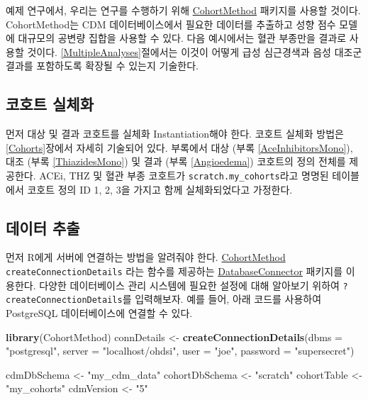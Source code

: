 \documentclass[10.5pt]{book}
\newenvironment{Shaded}{\begin{snugshade}}{\end{snugshade}}
\newcommand{\KeywordTok}[1]{\textcolor[rgb]{0.13,0.29,0.53}{\textbf{#1}}}
\newcommand{\DataTypeTok}[1]{\textcolor[rgb]{0.13,0.29,0.53}{#1}}
\newcommand{\StringTok}[1]{\textcolor[rgb]{0.31,0.60,0.02}{#1}}
\newcommand{\NormalTok}[1]{#1}
\theoremstyle{definition}
\theoremstyle{definition}
\theoremstyle{definition}
\theoremstyle{remark}
\begin{document}
예제 연구에서, 우리는 연구를 수행하기 위해
\href{https://ohdsi.github.io/CohortMethod/}{CohortMethod} 패키지를
사용할 것이다. CohortMethod는 CDM 데이터베이스에서 필요한 데이터를
추출하고 성향 점수 모델에 대규모의 공변량 집합을 사용할 수 있다. 다음
예시에서는 혈관 부종만을 결과로 사용할 것이다.
\ref{MultipleAnalyses}절에서는 이것이 어떻게 급성 심근경색과 음성 대조군
결과를 포함하도록 확장될 수 있는지 기술한다.

\subsection{코호트 실체화}\label{-}

먼저 대상 및 결과 코호트를 실체화 Instantiation해야 한다. 코호트 실체화
방법은 \ref{Cohorts}장에서 자세히 기술되어 있다. 부록에서 대상 (부록
\ref{AceInhibitorsMono}), 대조 (부록 \ref{ThiazidesMono}) 및 결과 (부록
\ref{Angioedema}) 코호트의 정의 전체를 제공한다. ACEi, THZ 및 혈관 부종
코호트가 \texttt{scratch.my\_cohorts}라고 명명된 테이블에서 코호트 정의
ID 1, 2, 3을 가지고 함께 실체화되었다고 가정한다.

\subsection{데이터 추출}\label{-}

먼저 R에게 서버에 연결하는 방법을 알려줘야 한다.
\href{https://ohdsi.github.io/CohortMethod/}{CohortMethod}
\texttt{createConnectionDetails} 라는 함수를 제공하는
\href{https://ohdsi.github.io/DatabaseConnector/}{DatabaseConnector}
패키지를 이용한다. 다양한 데이터베이스 관리 시스템에 필요한 설정에 대해
알아보기 위하여 \texttt{?createConnectionDetails}를 입력해보자. 예를
들어, 아래 코드를 사용하여 PostgreSQL 데이터베이스에 연결할 수 있다.

\begin{Shaded}
\begin{Highlighting}[]
\KeywordTok{library}\NormalTok{(CohortMethod)}
\NormalTok{connDetails <-}\StringTok{ }\KeywordTok{createConnectionDetails}\NormalTok{(}\DataTypeTok{dbms =} \StringTok{"postgresql"}\NormalTok{,}
                                       \DataTypeTok{server =} \StringTok{"localhost/ohdsi"}\NormalTok{,}
                                       \DataTypeTok{user =} \StringTok{"joe"}\NormalTok{,}
                                       \DataTypeTok{password =} \StringTok{"supersecret"}\NormalTok{)}

\NormalTok{cdmDbSchema <-}\StringTok{ "my_cdm_data"}
\NormalTok{cohortDbSchema <-}\StringTok{ "scratch"}
\NormalTok{cohortTable <-}\StringTok{ "my_cohorts"}
\NormalTok{cdmVersion <-}\StringTok{ "5"}
\end{Highlighting}
\end{Shaded}
\end{document}
